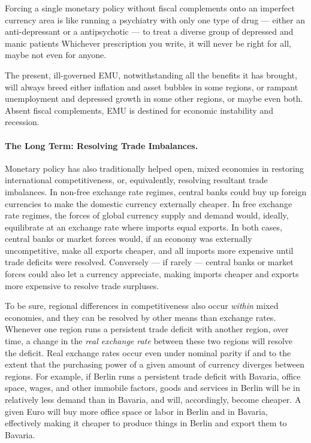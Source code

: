 \documentclass[11pt,a4paper,oneside,openright]{article}
\begin{document}
Forcing a single monetary policy without fiscal complements onto an imperfect currency area is like running a psychiatry with only one type of drug --- either an anti-depressant or a antipsychotic --- to treat a diverse group of depressed and manic patients
Whichever prescription you write, it will never be right for all, maybe not even for anyone.

The present, ill-governed \gls{EMU}, notwithstanding all the benefits it has brought, will always breed either inflation and asset bubbles in some regions, or rampant unemployment and depressed growth in some other regions, or maybe even both. 
Absent fiscal complements, \gls{EMU} is destined for economic instability and recession.

\paragraph[Long Term]{The Long Term: 
Resolving Trade Imbalances.} 
Monetary policy has also traditionally helped open, mixed economies in restoring international competitiveness, or, equivalently, resolving resultant trade imbalances. 
In non-free exchange rate regimes, central banks could buy up foreign currencies to make the domestic currency externally cheaper. 
In free exchange rate regimes, the forces of global currency supply and demand would, ideally, equilibrate at an exchange rate where imports equal exports. In both cases, central banks or market forces would, if an economy was externally uncompetitive, make all exports cheaper, and all imports more expensive until trade deficits were resolved. 
Conversely --- if rarely --- central banks or market forces could also let a currency appreciate, making imports cheaper and exports more expensive to resolve trade surpluses.

To be sure, regional differences in competitiveness also occur \emph{within} mixed economies, and they can be resolved by other means than exchange rates. 
Whenever one region runs a persistent trade deficit with another region, over time, a change in the \emph{real exchange rate} between these two regions will resolve the deficit. 
Real exchange rates occur even under nominal parity if and to the extent that the purchasing power of a given amount of currency diverges between regions. 
For example, if Berlin runs a persistent trade deficit with Bavaria, office space, wages, and other immobile factors, goods and services in Berlin will be in relatively less demand than in Bavaria, and will, accordingly, become cheaper. 
A given Euro will buy more office space or labor in Berlin and in Bavaria, effectively making it cheaper to produce things in Berlin and export them to Bavaria.
\end{document}
